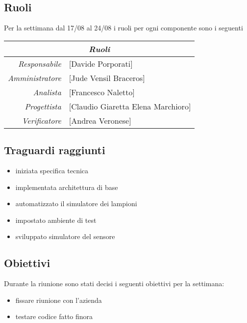 \documentclass[12pt]{article}
\begin{document}
\subsection{Ruoli}
Per la settimana dal 17/08 al 24/08 i ruoli per ogni componente sono i seguenti
\\
\begin{tabular}{r | l}
    \multicolumn{2}{c}{\textit{Ruoli}}\\
    \hline
    \textit{Responsabile} &
    [Davide Porporati]\makecell{}\\
    \textit{Amministratore} &
    [Jude Vensil Braceros]\makecell{}\\
    \textit{Analista} &
    [Francesco Naletto]\makecell{}\\
    \textit{Progettista} &
    [Claudio Giaretta Elena Marchioro]\makecell{}\\
    \textit{Verificatore} & 
    [Andrea Veronese]\makecell{}\\
\end{tabular}

\subsection{Traguardi raggiunti}
\begin{itemize}
    \item iniziata specifica tecnica
    \item implementata architettura di base
    \item automatizzato il simulatore dei lampioni
    \item impostato ambiente di test
    \item sviluppato simulatore del sensore
\end{itemize}

\subsection{Obiettivi}
Durante la riunione sono stati decisi i seguenti obiettivi per la settimana:
\begin{itemize}
    \item fissare riunione con l'azienda
    \item testare codice fatto finora
\end{itemize}
\end{document}
